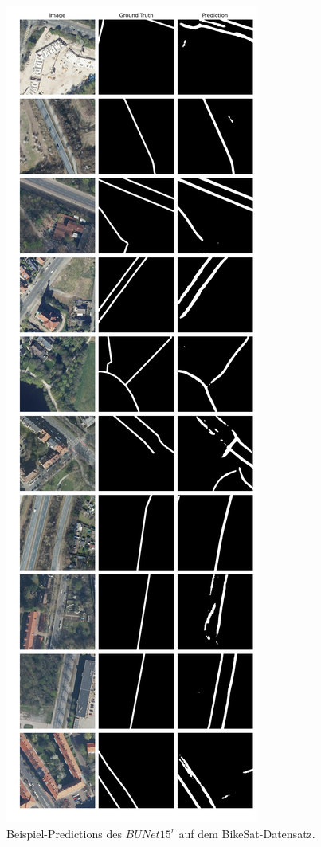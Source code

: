 \begin{figure}
	\centering
	\includegraphics[width=.41\textwidth]{Bilder/Samples-BikeSat/bunet15-r.png} 
	\caption{Beispiel-Predictions des $BUNet15^r$ auf dem BikeSat-Datensatz.}
	\label{fig:bikesat-samples-bunet15-r}
\end{figure}

